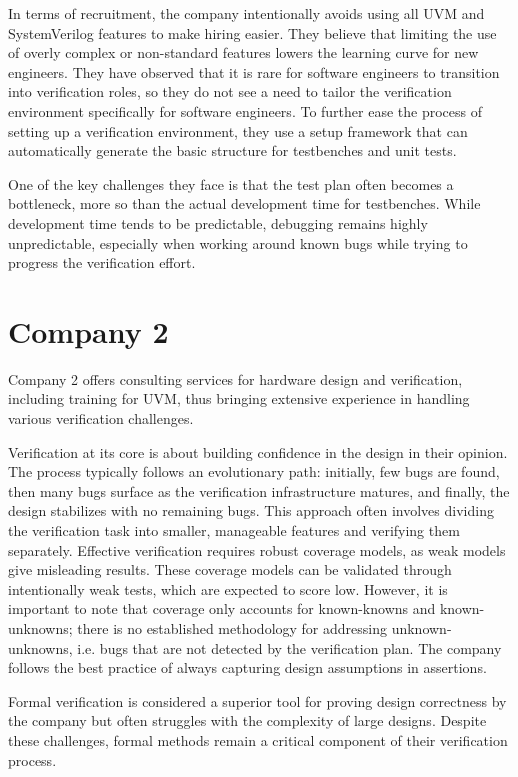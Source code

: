 In terms of recruitment, the company intentionally avoids using all UVM and SystemVerilog features to make hiring
easier. They believe that limiting the use of overly complex or non-standard features lowers the learning curve for
new engineers. They have observed that it is rare for software engineers to transition into verification roles, so
they do not see a need to tailor the verification environment specifically for software engineers. To further ease
the process of setting up a verification environment, they use a setup framework that can automatically generate the
basic structure for testbenches and unit tests.

One of the key challenges they face is that the test plan often becomes a bottleneck, more so than the actual
development time for testbenches. While development time tends to be predictable, debugging remains highly
unpredictable, especially when working around known bugs while trying to progress the verification effort.

\section{Company 2} %

Company 2 offers consulting services for hardware design and verification, including training for UVM, thus bringing
extensive experience in handling various verification challenges.

Verification at its core is about building confidence in the design in their opinion. The process typically follows
an evolutionary path: initially, few bugs are found, then many bugs surface as the verification infrastructure
matures, and finally, the design stabilizes with no remaining bugs. This approach often involves dividing the
verification task into smaller, manageable features and verifying them separately. Effective verification requires
robust coverage models, as weak models give misleading results. These coverage models can be validated through
intentionally weak tests, which are expected to score low. However, it is important to note that coverage only
accounts for known-knowns and known-unknowns; there is no established methodology for addressing unknown-unknowns,
i.e. bugs that are not detected by the verification plan. The company follows the best practice of always capturing
design assumptions in assertions.

Formal verification is considered a superior tool for proving design correctness by the company but often struggles with the
complexity of large designs. Despite these challenges, formal methods remain a critical component of their verification process.

